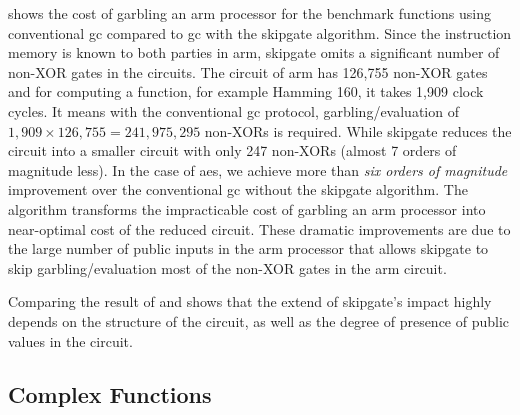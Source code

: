  shows the cost of garbling an \gls{arm} processor for the benchmark functions using conventional \acrshort{gc} compared to \acrshort{gc} with the \gls{skipgate} algorithm.
Since the instruction memory is known to both parties in \gls{arm}, \gls{skipgate} omits a significant number of non-XOR gates in the circuits.
The circuit of \gls{arm} has 126,755 non-XOR gates and for computing a function, for example Hamming 160, it takes 1,909 clock cycles.
It means with the conventional \acrshort{gc} protocol, garbling/evaluation of $1,909\times126,755=241,975,295$ non-XORs is required.
While \gls{skipgate} reduces the circuit into a smaller circuit with only 247 non-XORs (almost 7 orders of magnitude less).
In the case of \acrshort{aes}, we achieve more than {\it six orders of magnitude} improvement over the conventional \acrshort{gc} without the \gls{skipgate} algorithm.
The algorithm transforms the impracticable cost of garbling an \gls{arm} processor into near-optimal cost of the reduced circuit.
These dramatic improvements are due to the large number of public inputs in the \gls{arm} processor that allows \gls{skipgate} to skip garbling/evaluation most of the non-XOR gates in the \gls{arm} circuit.

Comparing the result of  and  shows that the extend of \gls{skipgate}'s impact highly depends on the structure of the circuit, as well as the degree of presence of public values in the circuit.

\subsection{Complex Functions}
\begin{table}[h]
\centering
\caption{\gls{skipgate} algorithm improvement on the \gls{arm} sequential circuit for the complex functions.}
\label{tab:complex_funct}
\end{table}

